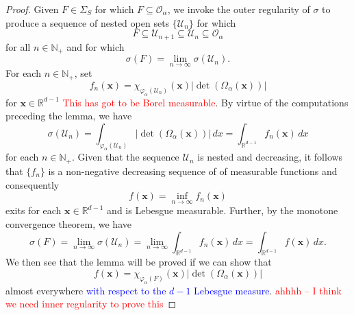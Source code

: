 \documentclass[11pt]{article}
\theoremstyle{theorem}
\renewcommand\det{\operatorname{det}}
\begin{document}
\begin{proof}
Given $F\in\Sigma_S$ for which $F\subseteq\mathcal{O}_\alpha$, we invoke the outer regularity of $\sigma$ to produce a sequence of nested open sets $\{\mathcal{U}_n\}$ for which
\begin{equation*}
F\subseteq \mathcal{U}_{n+1}\subseteq\mathcal{U}_n\subseteq\mathcal{O}_\alpha
\end{equation*}
for all $n\in\mathbb{N}_+$ and for which
\begin{equation*}
\sigma(F)=\lim_{n\to\infty}\sigma(\mathcal{U}_n).
\end{equation*}
For each $n\in\mathbb{N}_+$, set
\begin{equation*}
f_n(\mathbf{x})=\chi_{\varphi_\alpha(\mathcal{U}_n)}(\mathbf{x})|\det(\Omega_\alpha(\mathbf{x}))|
\end{equation*}
for $\mathbf{x}\in\mathbb{R}^{d-1}$ \textcolor{red}{This has got to be Borel measurable}. By virtue of the computations preceding the lemma, we have
\begin{equation*}
\sigma(\mathcal{U}_n)=\int_{\varphi_\alpha(\mathcal{U}_n)}|\det(\Omega_\alpha(\mathbf{x}))|\,dx=\int_{\mathbb{R}^{d-1}}f_n(\mathbf{x})\,dx
\end{equation*}
for each $n\in\mathbb{N}_+$. Given that the sequence $\mathcal{U}_n$ is nested and decreasing, it follows that $\{f_n\}$ is a non-negative decreasing sequence of of measurable functions and consequently
\begin{equation*}
f(\mathbf{x})=\inf_{n\to\infty}f_n(\mathbf{x})
\end{equation*}
exits for each $\mathbf{x}\in\mathbb{R}^{d-1}$ and is Lebesgue measurable. Further, by the monotone convergence theorem, we have
\begin{equation*}
\sigma(F)=\lim_{n\to\infty}\sigma(\mathcal{U}_n)=\lim_{n\to\infty}\int_{\mathbb{R}^{d-1}}f_n(\mathbf{x})\,dx=\int_{\mathbb{R}^{d-1}}f(\mathbf{x})\,dx.
\end{equation*}
We then see that the lemma will be proved if we can show that
\begin{equation*}
f(\mathbf{x})=\chi_{\varphi_{\alpha}(F)}(\mathbf{x})|\det(\Omega_\alpha(\mathbf{x}))|
\end{equation*}
almost everywhere \textcolor{blue}{with respect to the $d-1$ Lebesgue measure}. \textcolor{red}{ahhhh -- I think we need inner regularity to prove this}
\end{proof}
\end{document}

